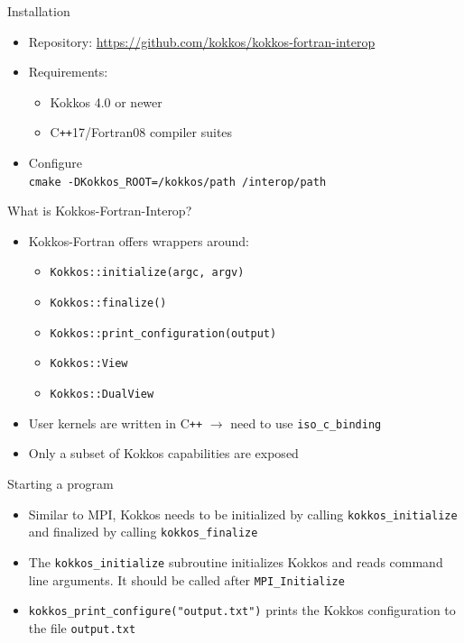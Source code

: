 \begin{frame}{Installation}
  \begin{itemize}
    \item Repository: \url{https://github.com/kokkos/kokkos-fortran-interop}
    \item Requirements:
      \begin{itemize}
        \item Kokkos 4.0 or newer
        \item C\texttt{++}17/Fortran08 compiler suites
      \end{itemize}
    \item Configure\\
      \texttt{cmake -DKokkos\_ROOT=/kokkos/path /interop/path}
  \end{itemize}
\end{frame}

\begin{frame}{What is Kokkos-Fortran-Interop?}
  \begin{itemize}
    \item Kokkos-Fortran offers wrappers around:
      \begin{itemize}
        \item \texttt{Kokkos::initialize(argc, argv)}
        \item \texttt{Kokkos::finalize()}
        \item \texttt{Kokkos::print\_configuration(output)}
        \item \texttt{Kokkos::View} 
        \item \texttt{Kokkos::DualView}
      \end{itemize}
    \item User kernels are written in C\texttt{++} $\rightarrow$ need to use
      \texttt{iso\_c\_binding}
    \item Only a subset of Kokkos capabilities are exposed
  \end{itemize}
\end{frame}

\begin{frame}{Starting a program}
  \begin{itemize}
    \item Similar to MPI, Kokkos needs to be initialized by calling
      \texttt{kokkos\_initialize} and finalized by calling \texttt{kokkos\_finalize}
    \item The \texttt{kokkos\_initialize} subroutine initializes Kokkos and
      reads command line arguments. It should be called after
      \texttt{MPI\_Initialize}
    \item \texttt{kokkos\_print\_configure("output.txt")} prints the
      Kokkos configuration to the file \texttt{output.txt}
  \end{itemize}
\end{frame}

